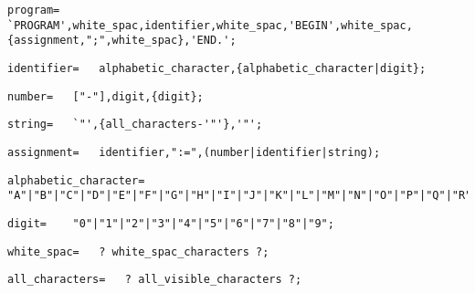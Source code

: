 \documentclass{article}
\begin{document}
    \begin{flushleft}
    \begin{lstlisting}[mathescape=true, breaklines=true]
      program= 	`PROGRAM',white_spac,identifier,white_spac,'BEGIN',white_spac,{assignment,";",white_spac},'END.';
    \end{lstlisting}
    \end{flushleft}
    \begin{flushleft}
    \begin{lstlisting}[mathescape=true, breaklines=true]
      identifier= 	alphabetic_character,{alphabetic_character|digit};
    \end{lstlisting}
    \end{flushleft}
    \begin{flushleft}
    \begin{lstlisting}[mathescape=true, breaklines=true]
      number= 	["-"],digit,{digit};
    \end{lstlisting}
    \end{flushleft}
    \begin{flushleft}
    \begin{lstlisting}[mathescape=true, breaklines=true]
      string= 	`"',{all_characters-'"'},'"';
    \end{lstlisting}
    \end{flushleft}
    \begin{flushleft}
    \begin{lstlisting}[mathescape=true, breaklines=true]
      assignment= 	identifier,":=",(number|identifier|string);
    \end{lstlisting}
    \end{flushleft}
    \begin{flushleft}
    \begin{lstlisting}[mathescape=true, breaklines=true]
      alphabetic_character= 	"A"|"B"|"C"|"D"|"E"|"F"|"G"|"H"|"I"|"J"|"K"|"L"|"M"|"N"|"O"|"P"|"Q"|"R"|"S"|"T"|"U"|"V"|"W"|"X"|"Y"|"Z";
    \end{lstlisting}
    \end{flushleft}
    \begin{flushleft}
    \begin{lstlisting}[mathescape=true, breaklines=true]
      digit= 	"0"|"1"|"2"|"3"|"4"|"5"|"6"|"7"|"8"|"9";
    \end{lstlisting}
    \end{flushleft}
    \begin{flushleft}
    \begin{lstlisting}[mathescape=true, breaklines=true]
      white_spac= 	? white_spac_characters ?;
    \end{lstlisting}
    \end{flushleft}
    \begin{flushleft}
    \begin{lstlisting}[mathescape=true, breaklines=true]
      all_characters= 	? all_visible_characters ?;
    \end{lstlisting}
    \end{flushleft}
\end{document}
